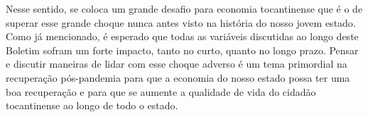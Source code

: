 \par Nesse sentido, se coloca um grande desafio para economia tocantinense que é o de superar esse grande choque nunca antes visto na história do nosso jovem estado. Como já mencionado, é esperado que todas as variáveis discutidas ao longo deste Boletim sofram um forte impacto, tanto no curto, quanto no longo prazo. Pensar e discutir maneiras de lidar com esse choque adverso é um tema primordial na recuperação pós-pandemia para que a economia do nosso estado possa ter uma boa recuperação e para que se aumente a qualidade de vida do cidadão tocantinense ao longo de todo o estado.